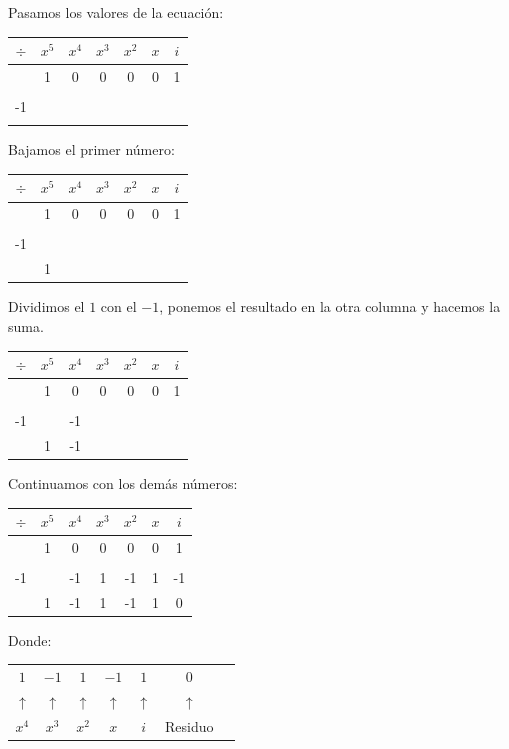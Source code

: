 \documentclass[11pt]{report}
\begin{document}
\indent Pasamos los valores de la ecuación:
\begin{center}
	\begin{tabular}{c|cccccc|}
		$\div$&$x^{5}$& $x^{4}$ & $x^{3}$ & $x^{2}$ & $x$ & $i$\\ \hline
		& 1 & 0 & 0 & 0 & 0 & 1\\
		& & & & & &\\
		-1&  & &  &  &  &  \\ \hline
		& &  &  & &  &  \\
	\end{tabular}
\end{center}

\indent Bajamos el primer número:
	\begin{center}
		\begin{tabular}{c|cccccc|}
		$\div$&$x^{5}$& $x^{4}$ & $x^{3}$ & $x^{2}$ & $x$ & $i$\\ \hline
		& 1 & 0 & 0 & 0 & 0 & 1\\
		& & & & & &\\
		-1&  & &  &  &  &  \\ \hline
		& 1 &  &  & &  &  \\
	\end{tabular}
\end{center}	
	
\indent Dividimos el $1$ con el $-1$, ponemos el resultado en la otra columna y hacemos la suma.
\begin{center}
		\begin{tabular}{c|cccccc|}
		$\div$&$x^{5}$& $x^{4}$ & $x^{3}$ & $x^{2}$ & $x$ & $i$\\ \hline
		& 1 & 0 & 0 & 0 & 0 & 1\\
		& & & & & &\\
		-1&  & -1 &  &  &  &  \\ \hline
		& 1 & -1 &  & &  &  \\
	\end{tabular}
\end{center}

\indent Continuamos con los demás números:
\begin{center}
		\begin{tabular}{c|cccccc|}
		$\div$&$x^{5}$& $x^{4}$ & $x^{3}$ & $x^{2}$ & $x$ & $i$\\ \hline
		& 1 & 0 & 0 & 0 & 0 & 1\\
		& & & & & &\\
		-1&  & -1 & 1 & -1 & 1 & -1 \\ \hline
		& 1 & -1 & 1 & -1 & 1 & 0 \\
	\end{tabular}
	Donde:
	\begin{tabular}{ccccccc}
		$1$&$-1$& $1$ & $-1$ & $1$ & $0$ \\ 
		$\uparrow$& $\uparrow$ & $\uparrow$ & $\uparrow$ & $\uparrow$ & $\uparrow$\\ 
		$x^{4}$& $x^{3}$ & $x^{2}$ & $x$ & $i$ & Residuo\\
	\end{tabular}
	
\end{center}
\end{document}
